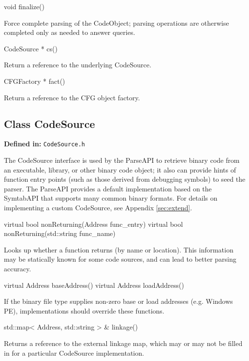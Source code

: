 \documentclass{article}
\newenvironment{apient}{\small\verbatim}{\endverbatim}
\newcommand{\apidesc}[1]{%
{\addtolength{\leftskip}{4em}%
#1\par\medskip}
}
\newcommand{\definedin}[1]{%
\textbf{Defined in:} \texttt{#1}
}
\begin{document}
\begin{apient}
void finalize()
\end{apient}
\apidesc{Force complete parsing of the CodeObject; parsing operations are otherwise completed only as needed to answer queries.}

\begin{apient}
CodeSource * cs()
\end{apient}
\apidesc{Return a reference to the underlying CodeSource.}

\begin{apient}
CFGFactory * fact()
\end{apient}
\apidesc{Return a reference to the CFG object factory.}

\subsection{Class CodeSource}
\label{sec:codesource}

\definedin{CodeSource.h}

The CodeSource interface is used by the ParseAPI to retrieve binary code from
an executable, library, or other binary code object; it also can provide hints
of function entry points (such as those derived from debugging symbols) to seed
the parser. The ParseAPI provides a default implementation based on the
SymtabAPI that supports many common binary formats. For details on implementing
a custom CodeSource, see Appendix \ref{sec:extend}.

\begin{apient}
virtual bool nonReturning(Address func_entry)
virtual bool nonReturning(std::string func_name)
\end{apient}
\apidesc{Looks up whether a function returns (by name or location). This information may be statically known for some code sources, and can lead to better parsing accuracy.}

\begin{apient}
virtual Address baseAddress()
virtual Address loadAddress()
\end{apient}
\apidesc{If the binary file type supplies non-zero base or load addresses (e.g. Windows PE), implementations should override these functions.}

\begin{apient}
std::map< Address, std::string > & linkage()
\end{apient}
\apidesc{Returns a reference to the external linkage map, which may or may not be filled in for a particular CodeSource implementation.}
\end{document}
